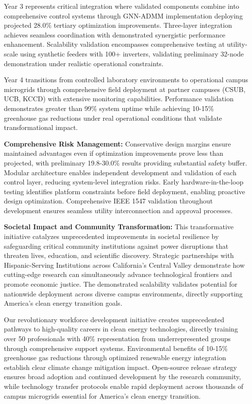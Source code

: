 \documentclass[12pt]{article}
\begin{document}
Year 3 represents critical integration where validated components combine into comprehensive control systems through GNN-ADMM implementation deploying projected 28.0\% tertiary optimization improvements. Three-layer integration achieves seamless coordination with demonstrated synergistic performance enhancement. Scalability validation encompasses comprehensive testing at utility-scale using synthetic feeders with 100+ inverters, validating preliminary 32-node demonstration under realistic operational constraints.

Year 4 transitions from controlled laboratory environments to operational campus microgrids through comprehensive field deployment at partner campuses (CSUB, UCB, KCCD) with extensive monitoring capabilities. Performance validation demonstrates greater than 99\% system uptime while achieving 10-15\% greenhouse gas reductions under real operational conditions that validate transformational impact.

\textbf{Comprehensive Risk Management:} Conservative design margins ensure maintained advantages even if optimization improvements prove less than projected, with preliminary 19.8-30.0\% results providing substantial safety buffer. Modular architecture enables independent development and validation of each control layer, reducing system-level integration risks. Early hardware-in-the-loop testing identifies platform constraints before field deployment, enabling proactive design optimization. Comprehensive IEEE 1547 validation \cite{ieee1547} throughout development ensures seamless utility interconnection and approval processes.

\textbf{Societal Impact and Community Transformation:} This transformative initiative catalyzes unprecedented improvements in societal resilience by safeguarding critical community institutions against power disruptions that threaten lives, education, and scientific discovery. Strategic partnerships with Hispanic-Serving Institutions across California's Central Valley demonstrate how cutting-edge research can simultaneously advance technological frontiers and promote economic justice. The demonstrated scalability validates potential for nationwide deployment across diverse campus environments, directly supporting America's clean energy transition goals.

Our revolutionary workforce development initiative creates unprecedented pathways to high-quality careers in clean energy technologies, directly training over 50 professionals with 40\% representation from underrepresented groups through comprehensive support systems. Environmental benefits of 10-15\% greenhouse gas reductions through optimized renewable energy integration establish clear climate change mitigation impact. Open-source release strategy ensures broad adoption and continued development by the research community, while technology transfer protocols enable rapid deployment across thousands of campus microgrids essential for America's clean energy transition.
\end{document}
